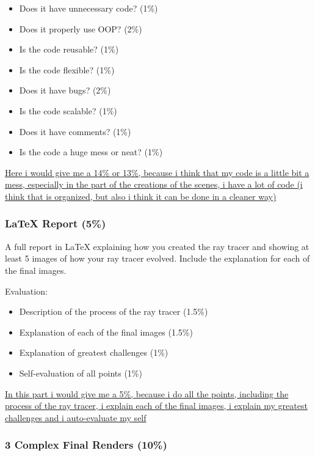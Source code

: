 \documentclass[
]{article}
\begin{document}
\begin{itemize}
\item
  Does it have unnecessary code? (1\%)
\item
  Does it properly use OOP? (2\%)
\item
  Is the code reusable? (1\%)
\item
  Is the code flexible? (1\%)
\item
  Does it have bugs? (2\%)
\item
  Is the code scalable? (1\%)
\item
  Does it have comments? (1\%)
\item
  Is the code a huge mess or neat? (1\%)
\end{itemize}

\ul{Here i would give me a 14\% or 13\%, because i think that my code is
a little bit a mess, especially in the part of the creations of the
scenes, i have a lot of code (i think that is organized, but also i
think it can be done in a cleaner way)}

\subsubsection{LaTeX Report (5\%)}\label{latex-report-5}

A full report in LaTeX explaining how you created the ray tracer and
showing at least 5 images of how your ray tracer evolved. Include the
explanation for each of the final images.

Evaluation:

\begin{itemize}
\item
  Description of the process of the ray tracer (1.5\%)
\item
  Explanation of each of the final images (1.5\%)
\item
  Explanation of greatest challenges (1\%)
\item
  Self-evaluation of all points (1\%)
\end{itemize}

\ul{In this part i would give me a 5\%, because i do all the points,
including the process of the ray tracer, i explain each of the final
images, i explain my greatest challenges and i auto-evaluate my self}

\subsubsection{3 Complex Final Renders
(10\%)}\label{complex-final-renders-10}
\end{document}
